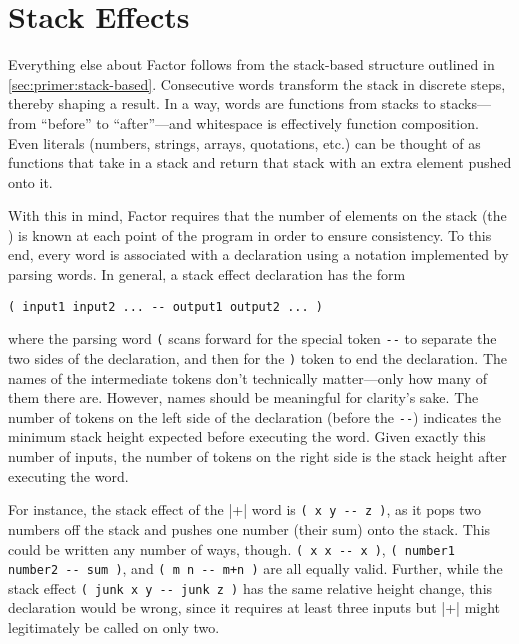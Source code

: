 \section{Stack Effects}\label{sec:primer:effects}

Everything else about Factor follows from the stack-based structure outlined in
\cref{sec:primer:stack-based}.  Consecutive words transform the stack in
discrete steps, thereby shaping a result.  In a way, words are functions from
stacks to stacks---from ``before'' to ``after''---and whitespace is effectively
function composition.  Even literals (numbers, strings, arrays, quotations,
etc.) can be thought of as functions that take in a stack and return that stack
with an extra element pushed onto it.

With this in mind, Factor requires that the number of elements on the stack
(the ) is known at each point of the program in order to
ensure consistency.  To this end, every word is associated with a  declaration using a notation implemented by parsing words.  In general,
a stack effect declaration has the form
%
\begin{center} \Verb|( input1 input2 ... -- output1 output2 ... )| \end{center}
%
\noindent where the parsing word \Verb|(| scans forward for the special token
\Verb|--| to separate the two sides of the declaration, and then for the
\Verb|)| token to end the declaration.  The names of the intermediate tokens
don't technically matter---only how many of them there are.  However, names
should be meaningful for clarity's sake.  The number of tokens on the left side
of the declaration (before the \Verb|--|) indicates the minimum stack height
expected before executing the word.  Given exactly this number of inputs, the
number of tokens on the right side is the stack height after executing the
word.

For instance, the stack effect of the \factor|+| word is
%
\Verb|( x y -- z )|,
%
as it pops two numbers off the stack and pushes one number (their sum) onto the
stack.  This could be written any number of ways, though.
%
\Verb|( x x -- x )|,
%
\Verb|( number1 number2 -- sum )|,
%
and
%
\Verb|( m n -- m+n )|
%
are all equally valid.  Further, while the stack effect
%
\Verb|( junk x y -- junk z )|
%
has the same relative height change, this declaration would be wrong, since it
requires at least three inputs but \factor|+| might legitimately be called on
only two.


